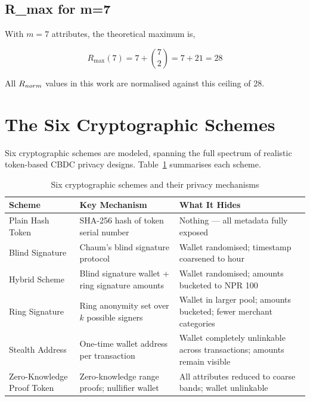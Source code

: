 \subsection{R\_max for m=7}

With $m = 7$ attributes, the theoretical maximum is,

\begin{equation}
R_{\mathrm{max}}(7) = 7 + \binom{7}{2}
= 7 + 21 = 28
\end{equation}

All $R_{norm}$ values in this work are normalised against
this ceiling of 28.

\section{The Six Cryptographic Schemes}
\label{sec:six_schemes}

Six cryptographic schemes are modeled, spanning the full
spectrum of realistic token-based CBDC privacy designs.
Table~\ref{tab:six_schemes} summarises each scheme.

\begin{table}[H]
\centering
\caption{Six cryptographic schemes and their privacy
mechanisms}
\label{tab:six_schemes}
\begin{tabular}{lp{4cm}p{4cm}}
\toprule
\textbf{Scheme} & \textbf{Key Mechanism} &
\textbf{What It Hides}\\
\midrule
Plain Hash Token &
SHA-256 hash of token serial number &
Nothing --- all metadata fully exposed\\

Blind Signature &
Chaum's blind signature protocol &
Wallet randomised; timestamp coarsened to hour\\

Hybrid Scheme &
Blind signature wallet + ring signature amounts &
Wallet randomised; amounts bucketed to NPR 100\\

Ring Signature &
Ring anonymity set over $k$ possible signers &
Wallet in larger pool; amounts bucketed; fewer merchant categories\\

Stealth Address &
One-time wallet address per transaction &
Wallet completely unlinkable across transactions; amounts remain visible\\

Zero-Knowledge Proof Token &
Zero-knowledge range proofs; nullifier wallet &
All attributes reduced to coarse bands; wallet unlinkable\\
\bottomrule
\end{tabular}
\end{table}

